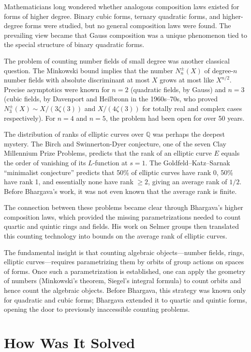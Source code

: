 Mathematicians long wondered whether analogous composition laws existed for forms of higher degree. Binary cubic forms, ternary quadratic forms, and higher-degree forms were studied, but no general composition laws were found. The prevailing view became that Gauss composition was a unique phenomenon tied to the special structure of binary quadratic forms.

The problem of counting number fields of small degree was another classical question. The Minkowski bound implies that the number $N_n^{\pm}(X)$ of degree-$n$ number fields with absolute discriminant at most $X$ grows at most like $X^{n/2}$. Precise asymptotics were known for $n=2$ (quadratic fields, by Gauss) and $n=3$ (cubic fields, by Davenport and Heilbronn in the 1960s--70s, who proved $N_3^{\pm}(X) \sim X/(3\zeta(3))$ and $X/(4\zeta(3))$ for totally real and complex cases respectively). For $n=4$ and $n=5$, the problem had been open for over 50 years.

The distribution of ranks of elliptic curves over $\mathbb{Q}$ was perhaps the deepest mystery. The Birch and Swinnerton-Dyer conjecture, one of the seven Clay Millennium Prize Problems, predicts that the rank of an elliptic curve $E$ equals the order of vanishing of its $L$-function at $s=1$. The Goldfeld--Katz--Sarnak ``minimalist conjecture'' predicts that 50\% of elliptic curves have rank 0, 50\% have rank 1, and essentially none have rank $\ge 2$, giving an average rank of $1/2$. Before Bhargava's work, it was not even known that the average rank is finite.

The connection between these problems became clear through Bhargava's higher composition laws, which provided the missing parametrizations needed to count quartic and quintic rings and fields. His work on Selmer groups then translated this counting technology into bounds on the average rank of elliptic curves.

The fundamental insight is that counting algebraic objects---number fields, rings, elliptic curves---requires parametrizing them by orbits of group actions on spaces of forms. Once such a parametrization is established, one can apply the geometry of numbers (Minkowski's theorem, Siegel's integral formula) to count orbits and hence count the algebraic objects. Before Bhargava, this strategy was known only for quadratic and cubic forms; Bhargava extended it to quartic and quintic forms, opening the door to previously inaccessible counting problems.

\section{How Was It Solved}

